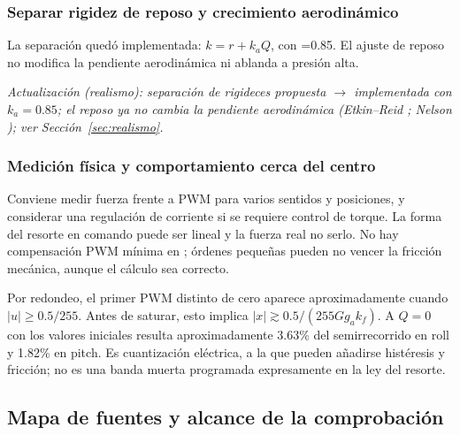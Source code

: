\subsubsection{Separar rigidez de reposo y crecimiento aerodinámico}
La separación quedó implementada: $k=r+k_aQ$, con =0.85. El ajuste de reposo no modifica la pendiente aerodinámica ni ablanda a presión alta.

\textit{Actualización (realismo): separación de rigideces propuesta $\rightarrow$ implementada con $k_a=0.85$; el reposo ya no cambia la pendiente aerodinámica (Etkin--Reid \cite{etkin1996}; Nelson \cite{nelson1998}); ver Sección~\ref{sec:realismo}.}

\subsubsection{Medición física y comportamiento cerca del centro}
Conviene medir fuerza frente a PWM para varios sentidos y posiciones, y considerar una regulación de corriente si se requiere control de torque. La forma del resorte en comando puede ser lineal y la fuerza real no serlo. No hay compensación PWM mínima en ; órdenes pequeñas pueden no vencer la fricción mecánica, aunque el cálculo sea correcto.

Por redondeo, el primer PWM distinto de cero aparece aproximadamente cuando $|u|\ge0.5/255$. Antes de saturar, esto implica $|x|\gtrsim0.5/(255Gg_ak_f)$. A $Q=0$ con los valores iniciales resulta aproximadamente 3.63\% del semirrecorrido en roll y 1.82\% en pitch. Es cuantización eléctrica, a la que pueden añadirse histéresis y fricción; no es una banda muerta programada expresamente en la ley del resorte.

\subsection{Mapa de fuentes y alcance de la comprobación}
